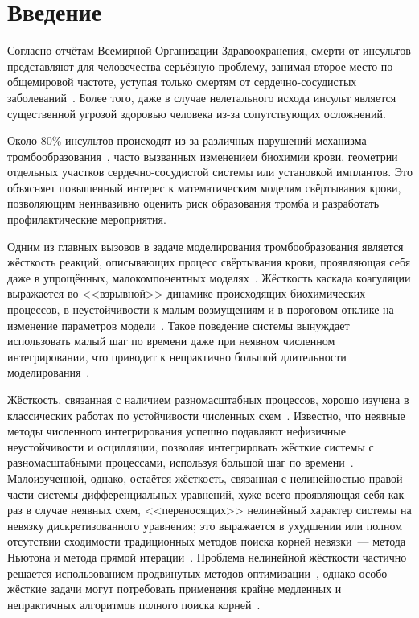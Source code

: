 \chapter{Введение}
\label{chapter:introduction} 

Согласно отчётам Всемирной Организации Здравоохранения,
смерти от инсультов представляют для человечества серьёзную проблему,
занимая второе место по общемировой частоте,
уступая только смертям от сердечно-сосудистых заболеваний~\cite{geoffrey2008stroke, who2020global_health_estimates}.
Более того, даже в случае нелетального исхода инсульт является существенной угрозой здоровью человека
из-за сопутствующих осложнений.

Около 80\% инсультов происходят из-за различных нарушений механизма тромбообразования~\cite{geoffrey2008stroke},
часто вызванных изменением биохимии крови,
геометрии отдельных участков сердечно-сосудистой системы
или установкой имплантов.
Это объясняет повышенный интерес к математическим моделям свёртывания крови,
позволяющим неинвазивно оценить риск образования тромба и разработать профилактические мероприятия.

Одним из главных вызовов в задаче моделирования тромбообразования является жёсткость реакций,
описывающих процесс свёртывания крови,
проявляющая себя даже в упрощённых, малокомпонентных моделях~\cite{bouchnita2020mathematical}.
Жёсткость каскада коагуляции выражается во <<взрывной>> динамике происходящих биохимических процессов,
в неустойчивости к малым возмущениям и в пороговом отклике на изменение параметров модели~\cite{shen2008threshold}.
Такое поведение системы вынуждает использовать малый шаг по времени даже при неявном численном интегрировании,
что приводит к непрактично большой длительности моделирования~\cite{douglas1967generalizedrk}.

Жёсткость, связанная с наличием разномасштабных процессов,
хорошо изучена в классических работах по устойчивости численных схем~\cite{auzinger1993modern, dahlquist1963special, dahlquist1975stability, liu2019study}.
Известно, что неявные методы численного интегрирования успешно подавляют нефизичные неустойчивости и осцилляции,
позволяя интегрировать жёсткие системы с разномасштабными процессами,
используя большой шаг по времени~\cite{heirer1999solvingode2}.
Малоизученной, однако, остаётся жёсткость, связанная с нелинейностью правой части системы дифференциальных уравнений,
хуже всего проявляющая себя как раз в случае неявных схем,
<<переносящих>> нелинейный характер системы на невязку дискретизованного уравнения;
это выражается в ухудшении или полном отсутствии сходимости традиционных методов поиска корней невязки~---
метода Ньютона и метода прямой итерации~\cite{lambert1991methods}.
Проблема нелинейной жёсткости частично решается использованием продвинутых
методов оптимизации~\cite{brown1985experiments, alexander1991modified, moore1994stepsize, schlenkrich2006application},
однако особо жёсткие задачи могут потребовать применения крайне медленных и непрактичных алгоритмов
полного поиска корней~\cite{farrell2016computation}.

